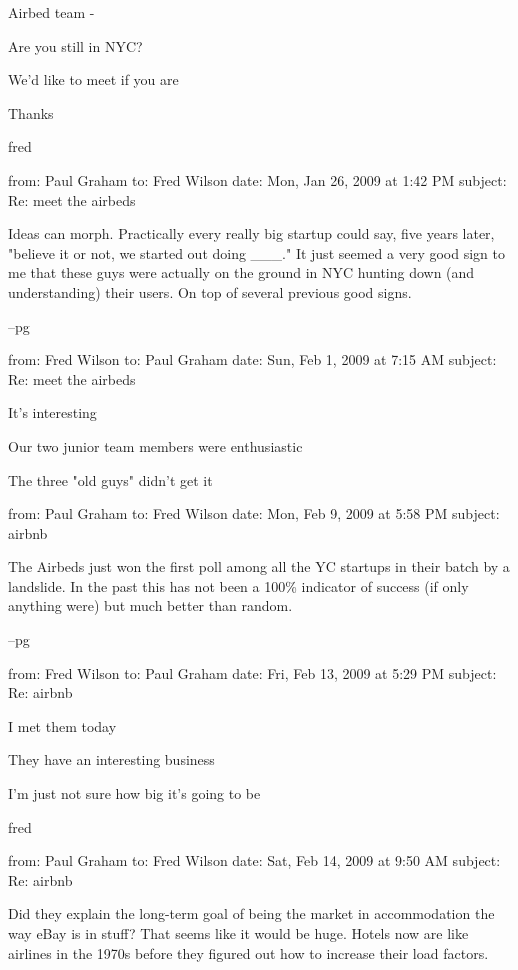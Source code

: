 Airbed team -

Are you still in NYC?

We'd like to meet if you are

Thanks

fred



from: Paul Graham
to: Fred Wilson
date: Mon, Jan 26, 2009 at 1:42 PM
subject: Re: meet the airbeds

Ideas can morph.  Practically every really big startup could say,
five years later, "believe it or not, we started out doing \_\_\_."
It just seemed a very good sign to me that these guys were actually
on the ground in NYC hunting down (and understanding) their users.
On top of several previous good signs.

--pg



from: Fred Wilson
to: Paul Graham
date: Sun, Feb 1, 2009 at 7:15 AM
subject: Re: meet the airbeds

It's interesting

Our two junior team members were enthusiastic

The three "old guys" didn't get it



from: Paul Graham
to: Fred Wilson
date: Mon, Feb 9, 2009 at 5:58 PM
subject: airbnb

The Airbeds just won the first poll among all the YC startups in
their batch by a landslide.  In the past this has not been a 100\%
indicator of success (if only anything were) but much better than
random.

--pg



from: Fred Wilson
to: Paul Graham
date: Fri, Feb 13, 2009 at 5:29 PM
subject: Re: airbnb

I met them today

They have an interesting business

I'm just not sure how big it's going to be

fred



from: Paul Graham
to: Fred Wilson
date: Sat, Feb 14, 2009 at 9:50 AM
subject: Re: airbnb

Did they explain the long-term goal of being the market in accommodation
the way eBay is in stuff?  That seems like it would be huge.  Hotels
now are like airlines in the 1970s before they figured out how to
increase their load factors.



